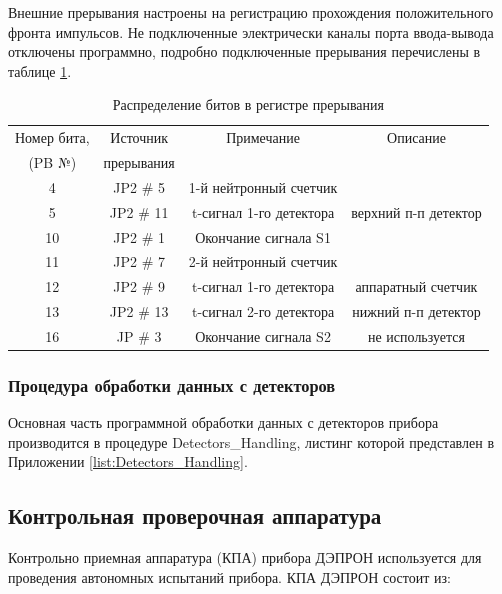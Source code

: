 Внешние прерывания настроены на регистрацию прохождения положительного фронта импульсов. Не подключенные электрически каналы порта ввода-вывода отключены программно, подробно подключенные прерывания перечислены в таблице \ref{tab:int}.

\begin{table} 
	\begin{tabular}{|c|c|c|c|}
		\hline
		Номер бита, &  Источник  &       Примечание        &       Описание       \\
		  (PB №)    & прерывания &                         &  \\ \hline
		     4      &  JP2 \# 5  & 1-й нейтронный счетчик  &  \\ \hline
		     5      & JP2 \# 11  & t-сигнал 1-го детектора & верхний п-п детектор \\ \hline
		    10      &  JP2 \# 1  &  Окончание сигнала S1   &  \\ \hline
		    11      &  JP2 \# 7  & 2-й нейтронный счетчик  &  \\ \hline
		    12      &  JP2 \# 9  & t-сигнал 1-го детектора &  аппаратный счетчик  \\ \hline
		    13      & JP2 \# 13  & t-сигнал 2-го детектора & нижний п-п детектор  \\ \hline
		    16      &  JP \# 3   &  Окончание сигнала S2   &   не используется    \\ \hline
	\end{tabular} 
	\caption{Распределение битов в регистре прерывания}
	\label{tab:int}
\end{table}




\subsubsection{Процедура обработки данных с детекторов}

Основная часть программной обработки данных с детекторов прибора производится в процедуре Detectors\_Handling, листинг которой представлен в Приложении \ref{list:Detectors_Handling}.




\subsection{Контрольная проверочная аппаратура}

Контрольно приемная аппаратура (КПА) прибора ДЭПРОН используется для  проведения автономных испытаний прибора. КПА ДЭПРОН состоит из:


